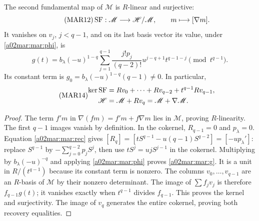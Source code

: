 \begin{theorem}\label{a02mar:mar:SFthm}
The second fundamental map of $\mathscr M$ is $R$-linear and surjective:
\begin{equation}\tag{MAR12}\label{a02mar:mar:SF}
 \operatorname{SF}:\mathscr M\longrightarrow\mathscr H/\mathscr M,
 \qquad m\longmapsto[\nabla m].
\end{equation}
It vanishes on $v_j$, $j<q-1$, and on its last basis vector its value,
under \eqref{a02mar:mar:phi}, is
\begin{equation}\tag{MAR13}\label{a02mar:mar:g}
 g(t)=b_\lambda(-u)^{1-q}
 \sum_{j=1}^{q-1}\frac{j!p_j}{(q-2)!}
                 u^{j-q+1}t^{q-1-j}\pmod{t^{q-1}}.
\end{equation}
Its constant term is $g_0=b_\lambda(-u)^{1-q}(q-1)\ne0$.
In particular,
\begin{equation}\tag{MAR14}\label{a02mar:mar:SFkernel}
 \begin{aligned}
 \ker\operatorname{SF}&=Rv_0+\cdots+Rv_{q-2}+t^{q-1}Rv_{q-1},\\
 \mathscr H&=\mathscr M+Rv_q=\mathscr M+\nabla\mathscr M.
 \end{aligned}
\end{equation}
\end{theorem}
\begin{proof}
The term $f'm$ in $\nabla(fm)=f'm+f\nabla m$ lies in
$\mathscr M$, proving $R$-linearity. The first $q-1$ images
vanish by definition. In the cokernel, $R_{q-1}=0$ and
$p_\lambda=0$. Equation \eqref{a02mar:mar:rec} gives
$[R_q]=[tS^{q-1}-u(q-1)S^{q-2}]=[-u p_\lambda']$:
replace $S^{q-1}$ by $-\sum_{j=0}^{q-2}p_jS^j$, then use
$tS^j=ujS^{j-1}$ in the cokernel. Multiplying by
$b_\lambda(-u)^{-q}$ and applying \eqref{a02mar:mar:phi} proves
\eqref{a02mar:mar:g}. It is a unit in $R/(t^{q-1})$ because its
constant term is nonzero. The columns $v_0,\ldots,v_{q-1}$
are an $R$-basis of $\mathscr M$ by their nonzero determinant.
The image of $\sum f_jv_j$ is therefore $f_{q-1}g(t)$;
it vanishes exactly when $t^{q-1}$ divides $f_{q-1}$. This
proves the kernel and surjectivity. The image of $v_q$ generates
the entire cokernel, proving both recovery equalities.
\end{proof}

